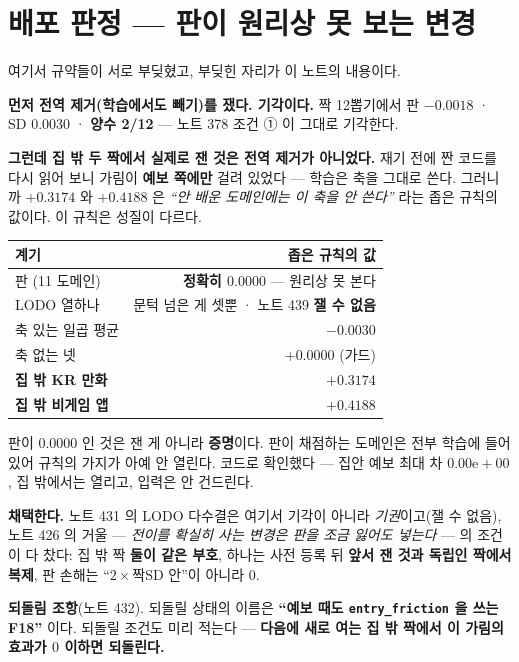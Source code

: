 \documentclass[11pt]{article}
\begin{document}
\section{배포 판정 --- 판이 원리상 못 보는 변경}

여기서 규약들이 서로 부딪혔고, 부딪힌 자리가 이 노트의 내용이다.

\textbf{먼저 전역 제거(학습에서도 빼기)를 쟀다. 기각이다.} 짝 12뽑기에서
판 $-0.0018$ · SD $0.0030$ · \textbf{양수 2/12} --- 노트 378 조건 ① 이
그대로 기각한다.

\textbf{그런데 집 밖 두 짝에서 실제로 잰 것은 전역 제거가 아니었다.} 재기
전에 짠 코드를 다시 읽어 보니 가림이 \textbf{예보 쪽에만} 걸려 있었다 ---
학습은 축을 그대로 쓴다. 그러니까 $+0.3174$ 와 $+0.4188$ 은
\emph{``안 배운 도메인에는 이 축을 안 쓴다''} 라는 좁은 규칙의 값이다.
이 규칙은 성질이 다르다.

\begin{center}
\begin{tabular}{lr}
\hline
계기 & 좁은 규칙의 값 \\
\hline
판 (11 도메인) & \textbf{정확히 $0.0000$} --- 원리상 못 본다 \\
LODO 열하나 & 문턱 넘은 게 셋뿐 · 노트 439 \textbf{잴 수 없음} \\
\quad 축 있는 일곱 평균 & $-0.0030$ \\
\quad 축 없는 넷 & $+0.0000$ (가드) \\
\textbf{집 밖 KR 만화} & $\mathbf{+0.3174}$ \\
\textbf{집 밖 비게임 앱} & $\mathbf{+0.4188}$ \\
\hline
\end{tabular}
\end{center}

판이 $0.0000$ 인 것은 잰 게 아니라 \textbf{증명}이다. 판이 채점하는
도메인은 전부 학습에 들어 있어 규칙의 가지가 아예 안 열린다. 코드로
확인했다 --- 집안 예보 최대 차 $0.00\mathrm{e}{+}00$, 집 밖에서는 열리고,
입력은 안 건드린다.

\textbf{채택한다.} 노트 431 의 LODO 다수결은 여기서 기각이 아니라
\emph{기권}이고(잴 수 없음), 노트 426 의 거울 --- \emph{전이를 확실히 사는
변경은 판을 조금 잃어도 넣는다} --- 의 조건이 다 찼다: 집 밖 짝
\textbf{둘이 같은 부호}, 하나는 사전 등록 뒤 \textbf{앞서 잰 것과 독립인
짝에서 복제}, 판 손해는 ``$2\times$짝SD 안''이 아니라 \textbf{$0$}.

\textbf{되돌림 조항}(노트 432). 되돌릴 상태의 이름은 \textbf{``예보 때도
\texttt{entry\_friction} 을 쓰는 F18''} 이다. 되돌릴 조건도 미리 적는다 ---
\textbf{다음에 새로 여는 집 밖 짝에서 이 가림의 효과가 $0$ 이하면
되돌린다.}
\end{document}
